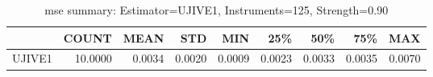 \begin{table}[ht]
\centering
\caption{mse summary: Estimator=UJIVE1, Instruments=125, Strength=0.90}
\begin{tabular}{lrrrrrrrr}
\toprule
 & COUNT & MEAN & STD & MIN & 25\% & 50\% & 75\% & MAX \\
\midrule
UJIVE1 & 10.0000 & 0.0034 & 0.0020 & 0.0009 & 0.0023 & 0.0033 & 0.0035 & 0.0070 \\
\bottomrule
\end{tabular}
\end{table}
